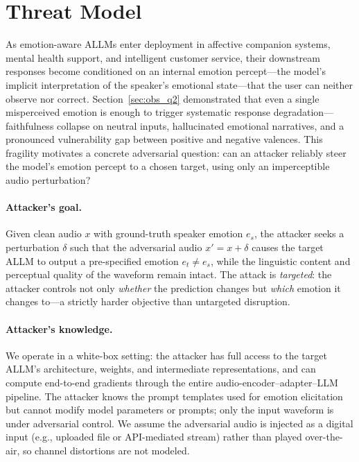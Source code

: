 
\section{Threat Model}
\label{sec:threat_model}

As emotion-aware ALLMs enter deployment in affective companion systems, mental health support, and intelligent customer service, their downstream responses become conditioned on an internal emotion percept---the model's implicit interpretation of the speaker's emotional state---that the user can neither observe nor correct.
Section~\ref{sec:obs_q2} demonstrated that even a single misperceived emotion is enough to trigger systematic response degradation---faithfulness collapse on neutral inputs, hallucinated emotional narratives, and a pronounced vulnerability gap between positive and negative valences.
This fragility motivates a concrete adversarial question: can an attacker reliably steer the model's emotion percept to a chosen target, using only an imperceptible audio perturbation?

\paragraph{Attacker's goal.}
Given clean audio $x$ with ground-truth speaker emotion $e_s$, the attacker seeks a perturbation $\delta$ such that the adversarial audio $x' = x + \delta$ causes the target ALLM to output a pre-specified emotion $e_t \neq e_s$, while the linguistic content and perceptual quality of the waveform remain intact.
The attack is \textit{targeted}: the attacker controls not only \textit{whether} the prediction changes but \textit{which} emotion it changes to---a strictly harder objective than untargeted disruption.

\paragraph{Attacker's knowledge.}
We operate in a white-box setting: the attacker has full access to the target ALLM's architecture, weights, and intermediate representations, and can compute end-to-end gradients through the entire audio-encoder--adapter--LLM pipeline.
The attacker knows the prompt templates used for emotion elicitation but cannot modify model parameters or prompts; only the input waveform is under adversarial control.
We assume the adversarial audio is injected as a digital input (e.g., uploaded file or API-mediated stream) rather than played over-the-air, so channel distortions are not modeled.

